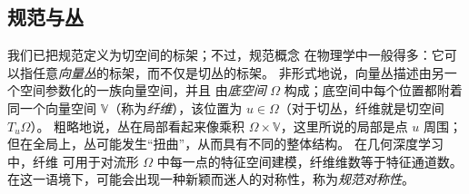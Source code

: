     











\subsection{规范与丛}
\label{sec:gauges}

我们已把规范定义为切空间的标架；不过，规范概念
%
在物理学中一般得多：它可以指任意\emph{向量丛}的标架，而不仅是切丛的标架。
%
非形式地说，向量丛描述由另一个空间参数化的一族向量空间，并且
由\emph{底空间} $\Omega$ 构成；底空间中每个位置都附着同一个向量空间 $\mathbb{V}$（称为\emph{纤维}），该位置为 $u \in \Omega$（对于切丛，纤维就是切空间 $T_u\Omega$）。
%
粗略地说，丛在局部看起来像乘积 $\Omega \times \mathbb{V}$，这里所说的局部是点 $u$ 周围；但在全局上，丛可能发生“扭曲”，从而具有不同的整体结构。
%
%
%
%
%
在几何深度学习中，纤维%
可用于对流形 $\Omega$ 中每一点的特征空间建模，纤维维数等于特征通道数。
在这一语境下，可能会出现一种新颖而迷人的对称性，称为\emph{规范对称性}。%

